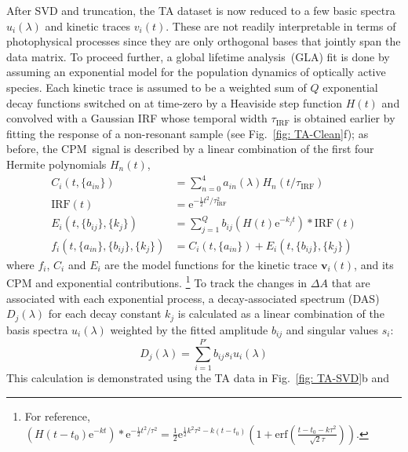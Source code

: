 After SVD and truncation, the TA dataset is now reduced to
a few basic spectra~$u_i(\lambda)$ and kinetic traces $v_i(t)$.
These are not readily interpretable in terms of photophysical processes
since they are only orthogonal bases that jointly span the data matrix.
To proceed further, a global lifetime analysis~(GLA) fit is done by assuming
an exponential model for the population dynamics of optically active species.
Each kinetic trace is assumed to be a weighted sum of $Q$ exponential decay functions
switched on at time-zero by a Heaviside step function $H(t)$ and convolved with a Gaussian IRF
whose temporal width $\tau_\text{IRF}$ is obtained earlier by fitting the response of
a non-resonant sample (see Fig.~\ref{fig: TA-Clean}f);
as before, the CPM~signal is described by a linear combination of the first four Hermite polynomials $H_n(t)$,
%
\begin{equation}
  \begin{aligned}
    C_i(t, \{a_{i n}\})
      & = \sum_{n = 0}^4 a_{i n}(\lambda) H_n \left( t/\tau_{\text{IRF}} \right)  \\
    \textrm{IRF}(t)
      & = \text{e}^{-\frac{1}{2} t^2/ \tau_\text{IRF}^2}  \\
    E_i(t, \{ b_{i j}\}, \{k_j\})
      & = \sum_{j = 1}^Q b_{i j} \left( H(t) \text{e}^{-k_j t}\right) \ast \text{IRF}(t) \nonumber\\
    f_i(t, \{a_{i n}\}, \{ b_{i j}\}, \{k_j\})
      & = C_i(t, \{a_{i n}\}) + E_i(t, \{ b_{i j}\}, \{k_j\})
    \label{eq: GA fit}
  \end{aligned}
\end{equation}
%
where $f_i$, $C_i$ and $E_i$ are the model functions for the kinetic trace $\boldsymbol{v}_i(t)$, and
its CPM and exponential contributions.%
\footnote{For reference,
$ \left( H(t - t_0) \text{e}^{-k t}\right) \ast \text{e}^{- \frac{1}{2} t^2/\tau^2} =
\frac{1}{2} \text{e}^{\frac{1}{2} k^2 \tau^2 - k (t - t_0)}
\left( 1 +
\text{erf}\left( \frac{t - t_0 - k \tau^2}{\sqrt{2} \tau} \right)
\right)$.
} To track the changes in $\Delta A$ that are associated with each exponential process,
a decay-associated spectrum (DAS) $D_j(\lambda)$ for each decay constant $k_j$
is calculated as a linear combination of the basis spectra $u_i(\lambda)$
weighted by the fitted amplitude $b_{i j}$ and singular values $s_i$:
%
\begin{equation}
  D_j(\lambda) = \sum_{i = 1}^{P'} b_{ij} s_i u_i(\lambda)
  \label{eq: DAS}
\end{equation}
%
This calculation is demonstrated using the TA data in Fig.~\ref{fig: TA-SVD}b and
